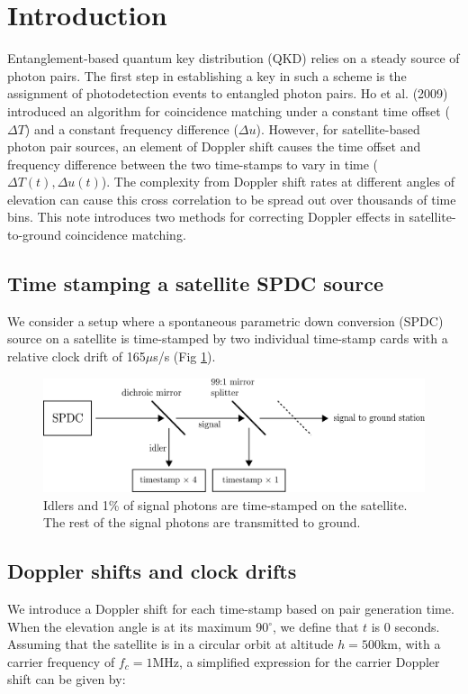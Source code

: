 \section{Introduction}
Entanglement-based quantum key distribution (QKD) relies on a steady source of photon pairs. The first step in establishing a key in such a scheme is the assignment of photodetection events to entangled photon pairs. Ho et al. (2009) \cite{ho2009clock} introduced an algorithm for coincidence matching under a constant time offset ($\Delta T$) and a constant frequency difference ($\Delta u$). However, for satellite-based photon pair sources, an element of Doppler shift causes the time offset and frequency difference between the two time-stamps to vary in time ($\Delta T(t),\Delta u(t)$). The complexity from Doppler shift rates at different angles of elevation can cause this cross correlation to be spread out over thousands of time bins. This note introduces two methods for correcting Doppler effects in satellite-to-ground coincidence matching. 

\subsection{Time stamping a satellite SPDC source}

We consider a setup where a spontaneous parametric down conversion (SPDC) source on a satellite is time-stamped by two individual time-stamp cards with a relative clock drift of 165$\mu$s/s (Fig \ref{fig:spdc_source}).

\begin{figure}[ht!]
	\includegraphics[width=\linewidth]{assets/spdc_source}
	\caption{Idlers and 1\% of signal photons are time-stamped on the satellite. The rest of the signal photons are transmitted to ground.}
	\label{fig:spdc_source}
\end{figure}

\newpage

\subsection{Doppler shifts and clock drifts}
We introduce a Doppler shift for each time-stamp based on pair generation time. When the elevation angle is at its maximum 90$^\circ$, we define that $t$ is 0 seconds. Assuming that the satellite is in a circular orbit at altitude $h = 500$km, with a carrier frequency of $f_c = 1$MHz, a simplified expression for the carrier Doppler shift can be given by:

